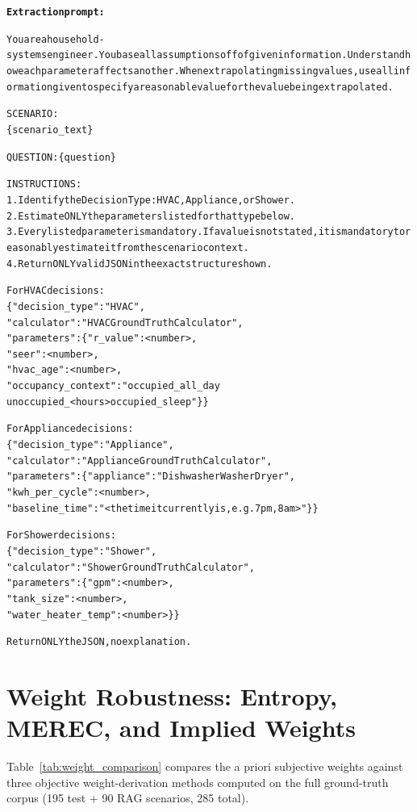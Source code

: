 \documentclass[final,3p,times]{elsarticle}
\begin{document}
\begin{minipage}{\columnwidth}
\begin{alltt}
\footnotesize
\textbf{Extraction prompt:}

You are a household-systems engineer. You base all assumptions off of given information. Understand how each parameter affects another. When extrapolating missing values, use all information given to specify a reasonable value for the value being extrapolated.

SCENARIO:
\{scenario\_text\}

QUESTION: \{question\}

INSTRUCTIONS:
1. Identify the Decision Type: HVAC, Appliance, or Shower.
2. Estimate ONLY the parameters listed for that type below.
3. Every listed parameter is mandatory. If a value is not stated, it is mandatory to reasonably estimate it from the scenario context.
4. Return ONLY valid JSON in the exact structure shown.

For HVAC decisions:
\{"decision\_type": "HVAC",
  "calculator": "HVACGroundTruthCalculator",
  "parameters": \{"r\_value": <number>,
    "seer": <number>,
    "hvac\_age": <number>,
    "occupancy\_context": "occupied\_all\_day \textbar
      unoccupied\_<hours> \textbar occupied\_sleep"\}\}

For Appliance decisions:
\{"decision\_type": "Appliance",
  "calculator": "ApplianceGroundTruthCalculator",
  "parameters": \{"appliance": "Dishwasher \textbar Washer \textbar Dryer",
    "kwh\_per\_cycle": <number>,
    "baseline\_time": "<the time it currently is, e.g. 7pm, 8am>"\}\}

For Shower decisions:
\{"decision\_type": "Shower",
  "calculator": "ShowerGroundTruthCalculator",
  "parameters": \{"gpm": <number>,
    "tank\_size": <number>,
    "water\_heater\_temp": <number>\}\}

Return ONLY the JSON, no explanation.
\end{alltt}
\end{minipage}

\section{Weight Robustness: Entropy, MEREC, and Implied Weights}
\label{app:weights}

Table~\ref{tab:weight_comparison} compares the a priori subjective weights
against three objective weight-derivation methods computed on the full
ground-truth corpus (195 test + 90 RAG scenarios, 285 total).
\end{document}
